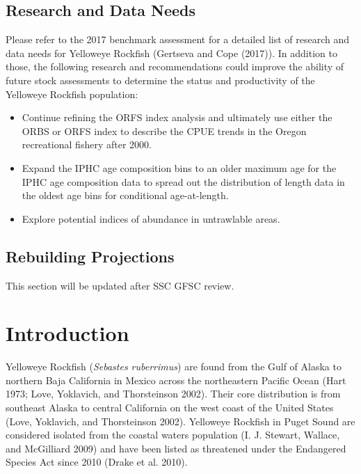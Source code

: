 \documentclass[
]{scrartcl}
\providecommand{\tightlist}{%
  \setlength{\itemsep}{0pt}\setlength{\parskip}{0pt}}\usepackage{longtable,booktabs,array}
\begin{document}
\subsection*{Research and Data Needs}\label{research-and-data-needs}

Please refer to the 2017 benchmark assessment for a detailed list of
research and data needs for Yelloweye Rockfish (Gertseva and Cope
(2017)). In addition to those, the following research and
recommendations could improve the ability of future stock assessments to
determine the status and productivity of the Yelloweye Rockfish
population:

\begin{itemize}
\tightlist
\item
  Continue refining the ORFS index analysis and ultimately use either
  the ORBS or ORFS index to describe the CPUE trends in the Oregon
  recreational fishery after 2000.
\item
  Expand the IPHC age composition bins to an older maximum age for the
  IPHC age composition data to spread out the distribution of length
  data in the oldest age bins for conditional age-at-length.
\item
  Explore potential indices of abundance in untrawlable areas.
\end{itemize}

\subsection*{Rebuilding Projections}\label{rebuilding-projections}

This section will be updated after SSC GFSC review.

\pagebreak

\newpage{}

\setlength{\parskip}{5mm plus1mm minus1mm}
\setcounter{page}{1}
\setcounter{section}{0}
\renewcommand{\thefigure}{\arabic{figure}}
\renewcommand{\thetable}{\arabic{table}}
\setcounter{table}{0}
\setcounter{figure}{0}

\clearpage

\section{Introduction}\label{introduction}

Yelloweye Rockfish (\emph{Sebastes ruberrimus}) are found from the Gulf
of Alaska to northern Baja California in Mexico across the northeastern
Pacific Ocean (Hart 1973; Love, Yoklavich, and Thorsteinson 2002). Their
core distribution is from southeast Alaska to central California on the
west coast of the United States (Love, Yoklavich, and Thorsteinson
2002). Yelloweye Rockfish in Puget Sound are considered isolated from
the coastal waters population (I. J. Stewart, Wallace, and McGilliard
2009) and have been listed as threatened under the Endangered Species
Act since 2010 (Drake et al. 2010).
\end{document}
